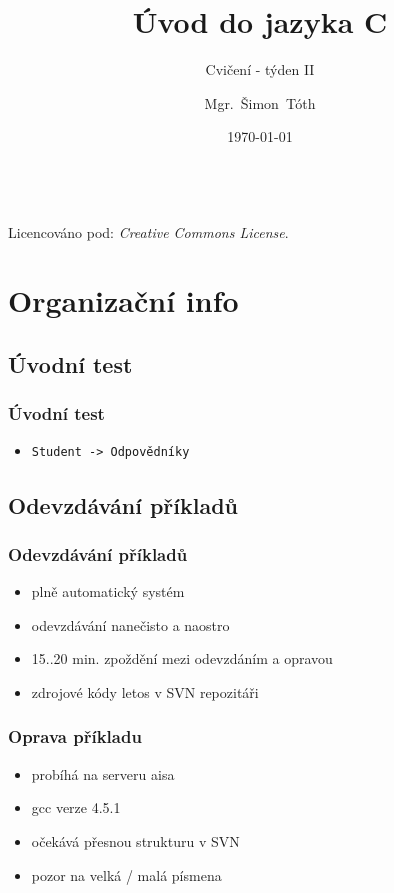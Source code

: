 

\title{Úvod do jazyka C}
\subtitle{Cvičení - týden II}
\author[]{Mgr.~Šimon~Tóth}
\date{\today}

\newcommand{\CcNote}[1]{%
        Licencováno pod: \textit{Creative Commons #1 3.0 License}.%
}


	\begin{frame}
		\titlepage
		\vfill
		\begin{center}
			\\
			{\tiny\CcNote{\CcLongnameByNcSa}}
			\vspace*{2ex}
		\end{center}
	\end{frame}

\section{Organizační info}
\subsection{Úvodní test}

\begin{frame}
	\frametitle{Úvodní test}
	\begin{itemize}
		\item{\texttt{Student -> Odpovědníky}}
	\end{itemize}
\end{frame}

\subsection{Odevzdávání příkladů}

\begin{frame}
	\frametitle{Odevzdávání příkladů}
	\begin{itemize}
		\item{plně automatický systém}
		\item{odevzdávání nanečisto a naostro}
		\item{15..20 min. zpoždění mezi odevzdáním a opravou}
		\item{zdrojové kódy letos v SVN repozitáři}
	\end{itemize}
\end{frame}

\begin{frame}
	\frametitle{Oprava příkladu}
	\begin{itemize}
		\item{probíhá na serveru aisa}
		\item{gcc verze 4.5.1}
		\item{očekává přesnou strukturu v SVN}
		\item{pozor na velká / malá písmena}
	\end{itemize}
\end{frame}

